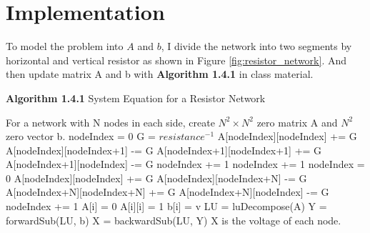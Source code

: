 \documentclass{article}
\begin{document}
\section{Implementation}
To model the problem into $A$ and $b$, I divide the network into two segments by horizontal and vertical resistor as shown in
Figure \ref{fig:resistor_network}. And then update matrix A and b with \textbf{Algorithm 1.4.1} in class material.
\begin{algorithm}[htb]
    \caption*{\textbf{Algorithm 1.4.1} System Equation for a Resistor Network}
    \label{algo:resistor_network}
    \begin{algorithmic}
        \State For a network with N nodes in each side, create $N^2 \times N^2$ zero matrix A and $N^2$ zero vector b.
        \State nodeIndex = 0
        \State G = $resistance^{-1}$
                \State A[nodeIndex][nodeIndex] += G
                \State A[nodeIndex][nodeIndex+1] -= G
                \State A[nodeIndex+1][nodeIndex+1] += G
                \State A[nodeIndex+1][nodeIndex] -= G
                \State nodeIndex += 1
            \EndFor
            \State nodeIndex += 1
        \EndFor
        \State nodeIndex = 0
                \State A[nodeIndex][nodeIndex] += G
                \State A[nodeIndex][nodeIndex+N] -= G
                \State A[nodeIndex+N][nodeIndex+N] += G
                \State A[nodeIndex+N][nodeIndex] -= G
                \State nodeIndex += 1
            \EndFor
        \EndFor
            \State A[i] = 0
            \State A[i][i] = 1
            \State b[i] = v
        \EndFor
        \State LU = luDecompose(A)
        \State Y = forwardSub(LU, b)
        \State X = backwardSub(LU, Y)
        \State X is the voltage of each node.
    \end{algorithmic}
\end{algorithm}
\end{document}
